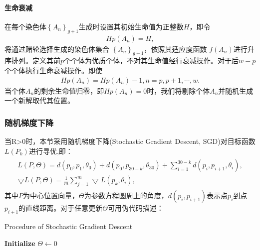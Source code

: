 \documentclass{whutmod}
\begin{document}
		\paragraph{生命衰减}
		在每个染色体$\left \{A_n  \right \}_{g+1}$生成时设置其初始生命值为正整数$H$，即令
	\begin{gather}
	Hp(A_n)=H,
	\end{gather}
	将通过赌轮选择生成的染色体集合 $\left \{A_n  \right \}_{g+1}$，依照其适应度函数
	$f(A_n)$进行升序排列。定义其前$p$个个体为优质个体，不对其生命值经行衰减操作。对于后$w-p$个个体执行生命衰减操作。即使
		\begin{gather}
		Hp(A_n)=Hp(A_n)-1,n=p,p+1,\cdots,w.
		\end{gather}
    当个体$A_n$的剩余生命值归零，即$Hp(A_n)=0$时，我们将剔除个体$A_n$并随机生成一个新解取代其位置。
	\subsubsection{随机梯度下降}	
    	 当R>0时，本节采用随机梯度下降(Stochastic Gradient Descent, SGD)对目标函数$L(P_k)$进行寻优,即：
    	 	    \begin{gather}
    	 \begin{matrix}
    	 L(P,\Theta)=d(p_0,p_{1},\theta_0)+d(p_0,p_{30-k},\theta_{30})+\sum_{i=1}^{30-k}d(p_i,p_{i+1},\theta_{i}) ,\\ 
    	 \bigtriangledown  L(P,\Theta)= \frac{1}{m}\sum_{j=1}^{m}\bigtriangledown L(p_k,\theta_{i}),
    	 \end{matrix}
    	 \end{gather}
    	 其中$P$为中心位置向量，$\Theta$为参数方程圆周上的角度，$d(p_i,p_{i+1})$表示点$p_i$到点$p_{i+1}$的直线距离。对于任意更新$\Theta$可用伪代码描述：
    	 
    	   	\begin{algorithm}[H]
    	 	\caption{Procedure of Stochastic Gradient Descent}
    	 	\LinesNumbered
    	 	\textbf{Initialize} $\Theta \leftarrow 0$ \newline
    	 	\Return {$\Theta$ }
    	 \end{algorithm}

		
\end{document}
